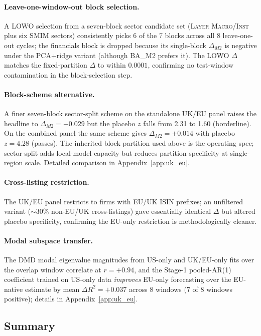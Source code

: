 \documentclass[11pt,a4paper]{article}
\begin{document}
\paragraph{Leave-one-window-out block selection.} A LOWO selection from a seven-block sector candidate set (\textsc{Layer Macro/Inst} plus six SMIM sectors) consistently picks 6 of the 7 blocks across all 8 leave-one-out cycles; the financials block is dropped because its single-block $\Delta_{M2}$ is negative under the PCA+ridge variant (although BA\_M2 prefers it). The LOWO $\Delta$ matches the fixed-partition $\Delta$ to within $0.0001$, confirming no test-window contamination in the block-selection step.

\paragraph{Block-scheme alternative.} A finer seven-block sector-split scheme on the standalone UK/EU panel raises the headline to $\Delta_{M2} = +0.029$ but the placebo $z$ falls from 2.31 to 1.60 (borderline). On the combined panel the same scheme gives $\Delta_{M2} = +0.014$ with placebo $z = 4.28$ (passes). The inherited block partition used above is the operating spec; sector-split adds local-model capacity but reduces partition specificity at single-region scale. Detailed comparison in Appendix~\ref{app:uk_eu}.

\paragraph{Cross-listing restriction.} The UK/EU panel restricts to firms with EU/UK ISIN prefixes; an unfiltered variant ($\sim 30\%$ non-EU/UK cross-listings) gave essentially identical $\Delta$ but altered placebo specificity, confirming the EU-only restriction is methodologically cleaner.

\paragraph{Modal subspace transfer.} The DMD modal eigenvalue magnitudes from US-only and UK/EU-only fits over the overlap window correlate at $r = +0.94$, and the Stage-1 pooled-AR(1) coefficient trained on US-only data \emph{improves} EU-only forecasting over the EU-native estimate by mean $\Delta R^2 = +0.037$ across 8 windows (7 of 8 windows positive); details in Appendix~\ref{app:uk_eu}.

\subsection{Summary}
\end{document}

